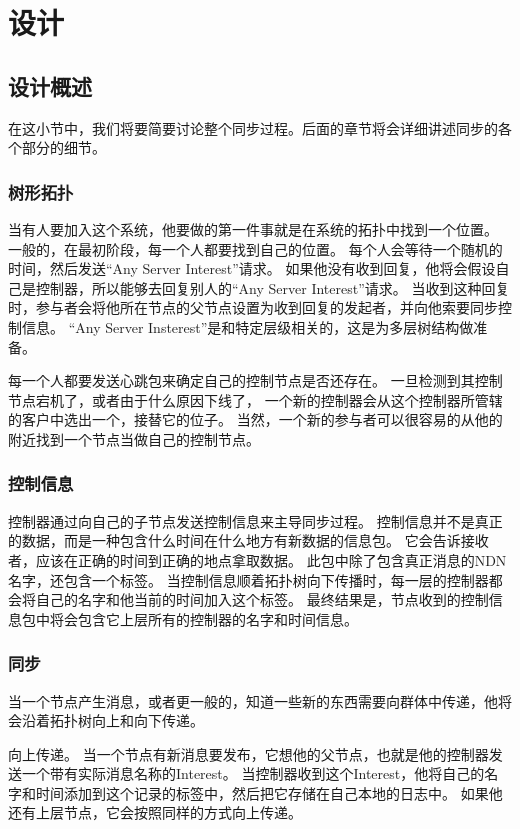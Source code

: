 \chapter{设计}


\section{设计概述}
在这小节中，我们将要简要讨论整个同步过程。后面的章节将会详细讲述同步的各个部分的细节。

\subsection{树形拓扑}

当有人要加入这个系统，他要做的第一件事就是在系统的拓扑中找到一个位置。
一般的，在最初阶段，每一个人都要找到自己的位置。
每个人会等待一个随机的时间，然后发送“Any Server Interest”请求。
如果他没有收到回复，他将会假设自己是控制器，所以能够去回复别人的“Any Server Interest”请求。
当收到这种回复时，参与者会将他所在节点的父节点设置为收到回复的发起者，并向他索要同步控制信息。
“Any Server Insterest”是和特定层级相关的，这是为多层树结构做准备。

每一个人都要发送心跳包来确定自己的控制节点是否还存在。
一旦检测到其控制节点宕机了，或者由于什么原因下线了，
一个新的控制器会从这个控制器所管辖的客户中选出一个，接替它的位子。
当然，一个新的参与者可以很容易的从他的附近找到一个节点当做自己的控制节点。

\subsection{控制信息}
控制器通过向自己的子节点发送控制信息来主导同步过程。
控制信息并不是真正的数据，而是一种包含什么时间在什么地方有新数据的信息包。
它会告诉接收者，应该在正确的时间到正确的地点拿取数据。
此包中除了包含真正消息的NDN名字，还包含一个标签。
当控制信息顺着拓扑树向下传播时，每一层的控制器都会将自己的名字和他当前的时间加入这个标签。
最终结果是，节点收到的控制信息包中将会包含它上层所有的控制器的名字和时间信息。

\subsection{同步}

当一个节点产生消息，或者更一般的，知道一些新的东西需要向群体中传递，他将会沿着拓扑树向上和向下传递。

向上传递。
当一个节点有新消息要发布，它想他的父节点，也就是他的控制器发送一个带有实际消息名称的Interest。
当控制器收到这个Interest，他将自己的名字和时间添加到这个记录的标签中，然后把它存储在自己本地的日志中。
如果他还有上层节点，它会按照同样的方式向上传递。


